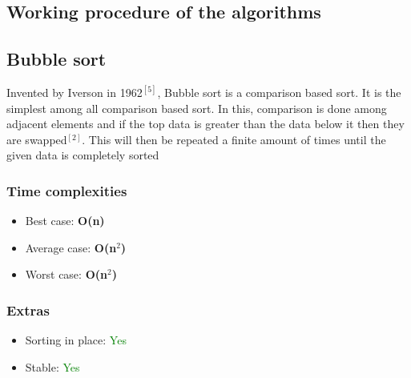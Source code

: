 \documentclass{article}
\begin{document}
\begin{center}
   \section{Working procedure of the algorithms} 
\end{center}
\bigskip
\begin{multicols}{2}
\titlespacing*{\subsection}
  {0pt}{4\baselineskip}{1.5\baselineskip}
  
\subsection{Bubble sort}

Invented by Iverson in 1962$^{[5]}$, Bubble sort is a comparison based sort. It is the simplest among all comparison based sort. In this, comparison is done among adjacent elements and if the top data is greater than the data below it then they are swapped$^{[2]}$. This will then be repeated a finite amount of times until the given data is completely sorted

\subsubsection{Time complexities}
\begin{itemize}
    \item Best case: \textbf{O(n)}
    \item Average case: \textbf{O(n$^2$)}
    \item Worst case: \textbf{O(n$^2$)}
\end{itemize}

\subsubsection{Extras}
\begin{itemize}
    \item Sorting in place: \textcolor{green}{Yes}
    \item Stable: \textcolor{green}{Yes}
\end{itemize}

\bigbreak \bigbreak \bigbreak \bigbreak \bigbreak \bigbreak \bigbreak \bigbreak \bigbreak \bigbreak \bigbreak \bigbreak




\end{multicols}
\end{document}
